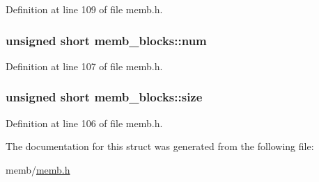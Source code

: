 Definition at line 109 of file memb.h.

\hypertarget{structmemb__blocks_a164124d48fe85bc98d9a300382a5245d}{
\subsubsection[{num}]{\setlength{\rightskip}{0pt plus 5cm}unsigned short {\bf memb\_\-blocks::num}}}
\label{structmemb__blocks_a164124d48fe85bc98d9a300382a5245d}


Definition at line 107 of file memb.h.

\hypertarget{structmemb__blocks_ab42c7af6114fde5d21206a2e18a7d3ee}{
\subsubsection[{size}]{\setlength{\rightskip}{0pt plus 5cm}unsigned short {\bf memb\_\-blocks::size}}}
\label{structmemb__blocks_ab42c7af6114fde5d21206a2e18a7d3ee}


Definition at line 106 of file memb.h.



The documentation for this struct was generated from the following file:\begin{DoxyCompactItemize}
\item 
memb/\hyperlink{memb_8h}{memb.h}\end{DoxyCompactItemize}
